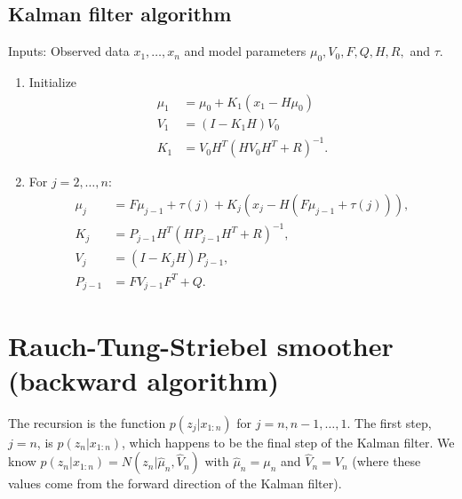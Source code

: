 \documentclass[11pt]{amsart}
\begin{document}
\subsection{Kalman filter algorithm}
Inputs:  Observed data $x_{1}, \ldots, x_{n}$ and model parameters $\mu_{0}, V_{0}, F, Q, H, R,$ and $\tau$.
\begin{enumerate}
\item{Initialize
\begin{align*}
\mu_{1} &= \mu_{0} + K_{1}(x_{1} - H\mu_{0}) \\
V_{1} &= (I - K_{1}H)V_{0} \\
K_{1} &= V_{0}H^T(HV_{0}H^{T} + R)^{-1}.
\end{align*}}
\item{For $j = 2,\ldots,n$:
\begin{align*}
\mu_{j} &= F\mu_{j-1} + \tau(j) + K_{j}(x_{j} - H(F\mu_{j-1}+\tau(j))), \\
K_{j} &= P_{j-1}H^{T}(HP_{j-1}H^{T} + R)^{-1}, \\
V_{j} &= (I - K_{j}H)P_{j-1}, \\
P_{j-1} &= FV_{j-1}F^{T} + Q.
\end{align*}}
\end{enumerate}
\section{Rauch-Tung-Striebel smoother (backward algorithm)}
The recursion is the function $p(z_{j}|x_{1:n})$ for $j = n, n-1, \ldots, 1$.  The first step, $j=n$, is $p(z_{n}|x_{1:n})$, which happens to be the final step of the Kalman filter.  We know $p(z_{n}|x_{1:n}) = N(z_{n}| \hat{\mu}_{n}, \hat{V}_{n})$ with $\hat{\mu}_{n} = \mu_{n}$ and $\hat{V}_{n} = V_{n}$ (where these values come from the forward direction of the Kalman filter).  
\end{document}
